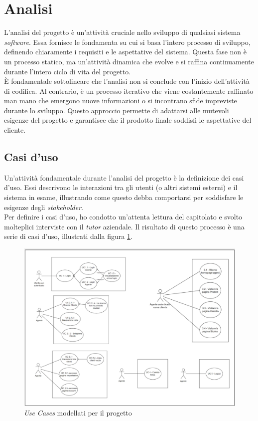 \section{Analisi}

L'analisi del progetto è un'attività cruciale nello sviluppo di qualsiasi sistema \textit{software}. Essa fornisce le 
fondamenta su cui si basa l'intero processo di sviluppo, definendo chiaramente i requisiti e le aspettative 
del sistema. Questa fase non è un processo statico, ma un'attività dinamica che evolve e si raffina continuamente durante 
l'intero ciclo di vita del progetto.\\
È fondamentale sottolineare che l'analisi non si conclude con l'inizio dell'attività di codifica. Al contrario, 
è un processo iterativo che viene costantemente raffinato man mano che emergono nuove informazioni o si incontrano sfide 
impreviste durante lo sviluppo. Questo approccio permette di adattarsi alle mutevoli esigenze del progetto e 
garantisce che il prodotto finale soddisfi le aspettative del cliente.

\subsection{Casi d'uso}

Un'attività fondamentale durante l'analisi del progetto è la definizione dei casi d'uso. Essi descrivono le interazioni tra gli utenti 
(o altri sistemi esterni) e il sistema in esame, illustrando come questo debba comportarsi per 
soddisfare le esigenze degli \textit{stakeholder}.\\
Per definire i casi d'uso, ho condotto un'attenta lettura del capitolato e svolto molteplici interviste con il \textit{tutor} 
aziendale. Il risultato di questo processo è una serie di casi d'uso, illustrati dalla figura \ref{fig:uc}.

\begin{figure}[H]
    \vspace{2em}
    \centering
    \includegraphics[width=0.7\columnwidth]{img/use_cases.jpg}
    \caption{\textit{Use Cases} modellati per il progetto}
    \label{fig:uc}
\end{figure}

